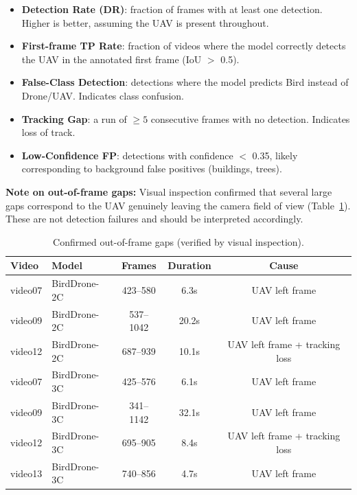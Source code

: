 \documentclass[11pt]{article}
\begin{document}
\begin{itemize}
  \item \textbf{Detection Rate (DR)}: fraction of frames with at least one
        detection. Higher is better, assuming the UAV is present throughout.
  \item \textbf{First-frame TP Rate}: fraction of videos where the model
        correctly detects the UAV in the annotated first frame (IoU $>$ 0.5).
  \item \textbf{False-Class Detection}: detections where the model predicts
        Bird instead of Drone/UAV. Indicates class confusion.
  \item \textbf{Tracking Gap}: a run of $\geq 5$ consecutive frames with no
        detection. Indicates loss of track.
  \item \textbf{Low-Confidence FP}: detections with confidence $<$ 0.35,
        likely corresponding to background false positives (buildings, trees).
\end{itemize}

\textbf{Note on out-of-frame gaps:} Visual inspection confirmed that several
large gaps correspond to the UAV genuinely leaving the camera field of view
(Table~\ref{tab:oof}). These are not detection failures and should be
interpreted accordingly.

\begin{table}[H]
\centering
\caption{Confirmed out-of-frame gaps (verified by visual inspection).}
\label{tab:oof}
\small
\begin{tabular}{llccc}
\toprule
\textbf{Video} & \textbf{Model} & \textbf{Frames} & \textbf{Duration} & \textbf{Cause} \\
\midrule
video07 & BirdDrone-2C  & 423--580  & 6.3s  & UAV left frame \\
video09 & BirdDrone-2C  & 537--1042 & 20.2s & UAV left frame \\
video12 & BirdDrone-2C  & 687--939  & 10.1s & UAV left frame + tracking loss \\
video07 & BirdDrone-3C  & 425--576  & 6.1s  & UAV left frame \\
video09 & BirdDrone-3C  & 341--1142 & 32.1s & UAV left frame \\
video12 & BirdDrone-3C  & 695--905  & 8.4s  & UAV left frame + tracking loss \\
video13 & BirdDrone-3C  & 740--856  & 4.7s  & UAV left frame \\
\bottomrule
\end{tabular}
\end{table}
\end{document}
